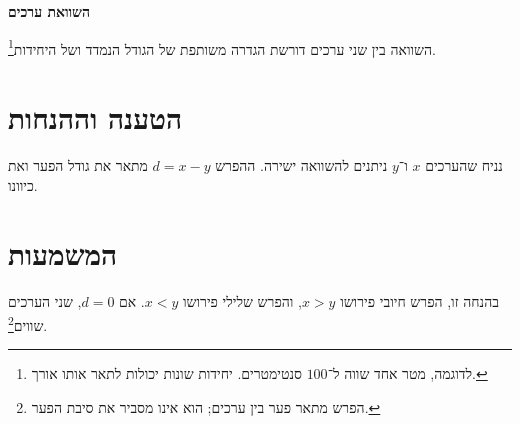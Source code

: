 \def\lakitdocumentclass{article}
\def\lakitclassoptions{11pt,a4paper}
\def\lakitgeometryoptions{margin=2.2cm,headheight=14pt}
\def\lakitlinespread{1.18}
\def\lakitparagraphstyle{block}





{\LARGE\sffamily\bfseries\noindent השוואת ערכים\par}\medskip
השוואה בין שני ערכים דורשת הגדרה משותפת של הגודל הנמדד ושל היחידות\footnote{לדוגמה, מטר אחד שווה ל־$100$ סנטימטרים. יחידות שונות יכולות לתאר אותו אורך.}.
\section{הטענה וההנחות}
נניח שהערכים $x$ ו־$y$ ניתנים להשוואה ישירה.
ההפרש $d=x-y$ מתאר את גודל הפער ואת כיוונו.
\PrintDocNotes
\section{המשמעות}
בהנחה זו, הפרש חיובי פירושו $x>y$, והפרש שלילי פירושו
$x<y$. אם $d=0$, שני הערכים שווים\footnote{הפרש מתאר פער בין ערכים; הוא אינו מסביר את סיבת הפער.}.

